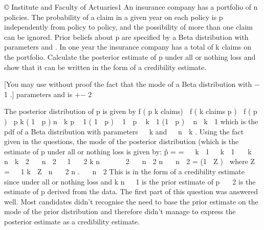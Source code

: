 \documentclass[a4paper,12pt]{article}
\begin{document}
© Institute and Faculty of Actuaries1
An insurance company has a portfolio of n policies. The probability of a claim in a
given year on each policy is p independently from policy to policy, and the possibility
of more than one claim can be ignored. Prior beliefs about p are specified by a Beta
distribution with parameters \alpha and \beta. In one year the insurance company has a total
of k claims on the portfolio.
Calculate the posterior estimate of p under all or nothing loss and show that it can be
written in the form of a credibility estimate.

[You may use without proof the fact that the mode of a Beta distribution with
\alpha − 1
.]
parameters \alpha and \beta is
\alpha +\beta− 2



The posterior distribution of p is given by
f ( p k claims)  f ( k claims p )  f ( p )
 p k ( 1  p ) n  k p  1 ( 1  p )  1
 p  k  1 (1  p )  n  k  1
which is the pdf of a Beta distribution with parameters   k and   n  k .
Using the fact given in the questions, the mode of the posterior distribution (which is
the estimate of p under all or nothing loss is given by:
p̂ =
=
  k  1
  k  1

 k  n  k  2  n  2
  1
 2
k
n

 
 2  n  2 n  n  2
= (1  Z ) 
where Z
=
  1
k
 Z 
n
 2
n
.
 n  2
This is in the form of a credibility estimate since
under all or nothing loss and k
n
  1
is the prior estimate of p
 2
is the estimate of p derived from the data.
The first part of this question was answered well. Most candidates didn’t recognise the need
to base the prior estimate on the mode of the prior distribution and therefore didn’t manage
to express the posterior estimate as a credibility estimate.
\end{document}
